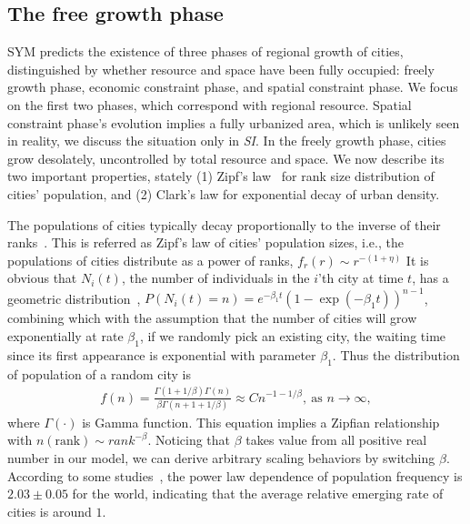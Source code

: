 \documentclass[reprint,unsortedaddress,amsmath,amssymb,aps,prl,showkeys]{revtex4-2}
\begin{document}
\subsection{The free growth phase}

SYM predicts the existence of three phases of regional growth of cities, distinguished by whether resource and space have been fully occupied: freely growth phase, economic constraint phase, and spatial constraint phase. We focus on the first two phases, which correspond with regional resource. Spatial constraint phase's evolution implies a fully urbanized area, which is unlikely seen in reality, we discuss the situation only in \textit{SI}. In the freely growth phase, cities grow desolately, uncontrolled by total resource and space. We now describe its two important properties, stately (1) Zipf's law~\cite{gabaix1999zipf's} for rank size distribution of cities' population, and (2) Clark's law for exponential decay of urban density\cite{clark1951urban}. 

The populations of cities typically decay proportionally to the inverse of their ranks~\cite{gabaix1999zipf's}. This is referred as Zipf's law of cities' population sizes, i.e., the populations of cities distribute as a power of ranks, $f_r(r)\sim r^{-(1+\eta)}$ %
It is obvious that $N_i(t)$, the number of individuals in the $i$'th city at time $t$, has a geometric distribution~\cite{durrett1999essentials}, $P(N_i(t)=n)=e^{-\beta_1t}(1-\exp(- {\beta_1} t))^{n-1}$, combining which with the assumption that the number of cities will grow exponentially at rate $\beta_1$, if we randomly pick an existing city, the waiting time since its first appearance is exponential with parameter $\beta_1$. Thus the distribution of population of a random city is 
\begin{align}
	f(n)=\frac{\Gamma(1+1/\beta)\Gamma(n)}{\beta\Gamma(n+1+1/\beta)}\approx Cn^{-1-1/\beta}, \ \text{as } n\to\infty,
\end{align}
where $\Gamma(\cdot)$ is Gamma function. This equation implies a Zipfian relationship with $n(\text{rank})\sim {rank}^{-\beta}$. Noticing that $\beta$ takes value from all positive real number in our model, we can derive arbitrary scaling behaviors by switching $\beta$. According to some studies~\cite{PhysRevLett.79.523}, the power law dependence of population frequency is $2.03\pm 0.05$ for the world, indicating that the average relative emerging rate of cities is around $1$. 
\end{document}
